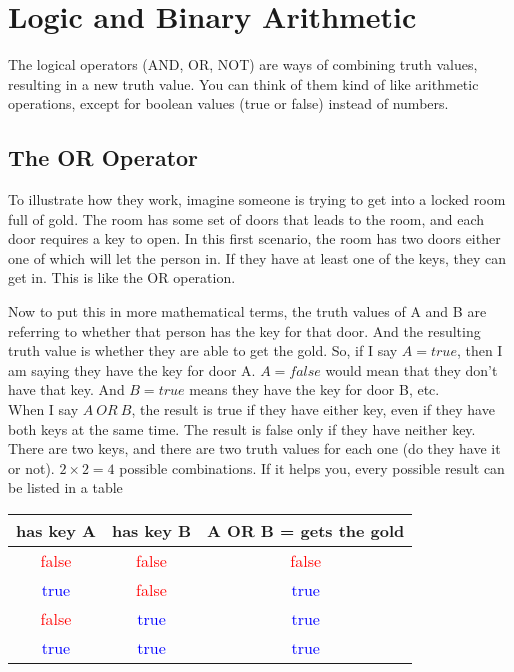 \chapter{Logic and Binary Arithmetic}

The logical operators (AND, OR, NOT) are ways of combining truth values, resulting in a new truth value. You can think of them kind of like arithmetic operations, except for boolean values (true or false) instead of numbers.\\

\section{The OR Operator}

To illustrate how they work, imagine someone is trying to get into a locked room full of gold. The room has some set of doors that leads to the room, and each door requires a key to open. In this first scenario, the room has two doors either one of which will let the person in. If they have at least one of the keys, they can get in. This is like the OR operation.\\

\begin{center} \end{center}

Now to put this in more mathematical terms, the truth values of A and B are referring to whether that person has the key for that door. And the resulting truth value is whether they are able to get the gold. So, if I say \(A=true\), then I am saying they have the key for door A. \(A=false\) would mean that they don't have that key. And \(B=true\) means they have the key for door B, etc.\\

When I say \(A\: OR \: B\), the result is true if they have either key, even if they have both keys at the same time. The result is false only if they have neither key. There are two keys, and there are two truth values for each one (do they have it or not). \(2 \times 2 = 4\) possible combinations. If it helps you, every possible result can be listed in a table\\

\begin{center}
	\begin{tabular}{c | c | c}
		has key A & has key B & A OR B = gets the gold\\ \hline
		\textcolor{red}{false} & \textcolor{red}{false} & \textcolor{red}{false}\\ \hline
		\textcolor{blue}{true} & \textcolor{red}{false} & \textcolor{blue}{true} \\ \hline
		\textcolor{red}{false} & \textcolor{blue}{true} & \textcolor{blue}{true} \\ \hline
		\textcolor{blue}{true} & \textcolor{blue}{true} &\textcolor{blue} {true} \\ \hline
	\end{tabular}
\end{center}

